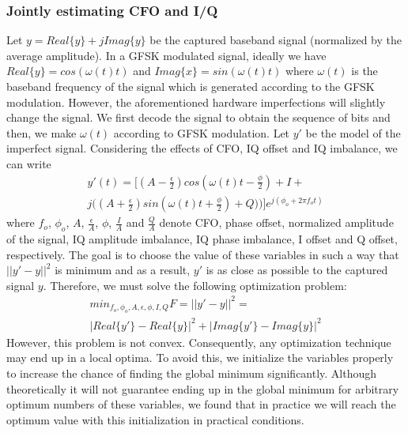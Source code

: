 \subsubsection{Jointly estimating CFO and I/Q}

Let $y = Real\{y\}+jImag\{y\}$ be the captured baseband signal (normalized by the average amplitude). In a GFSK modulated signal, ideally we have $Real\{y\} = cos(\omega(t)t)$ and $Imag\{x\} = sin(\omega(t)t)$ where $\omega(t)$ is the baseband frequency of the signal which is generated according to the GFSK modulation. However, the aforementioned hardware imperfections will slightly change the signal. We first decode the signal to obtain the sequence of bits and then, we make $\omega(t)$ according to GFSK modulation. Let $y'$ be the model of the imperfect signal. Considering the effects of CFO, IQ offset and IQ imbalance, we can write
\begin{gather*}
    y'(t) = \big[(A-\frac{\epsilon}{2})cos(\omega(t)t-\frac{\phi}{2})+I+ \\
    j\big((A+\frac{\epsilon}{2})sin(\omega(t)t+\frac{\phi}{2})+Q)\big)\big]e^{j(\phi_o+2\pi f_o t)}
\end{gather*}
where $f_o$, $\phi_o$, $A$, $\frac{\epsilon}{A}$, $\phi$, $\frac{I}{A}$ and $\frac{Q}{A}$ denote CFO, phase offset, normalized amplitude of the signal, IQ amplitude imbalance, IQ phase imbalance, I offset and Q offset, respectively. The goal is to choose the value of these variables in such a way that $||y'-y||^2$ is minimum and as a result, $y'$ is as close as possible to the captured signal $y$. Therefore, we must solve the following optimization problem:
\begin{gather*}
    min_{f_o,\phi_o,A,\epsilon,\phi,I,Q}{F=||y'-y||^2 =} \\ |Real\{y'\}-Real\{y\}|^2+|Imag\{y'\}-Imag\{y\}|^2
\end{gather*}
However, this problem is not convex. Consequently, any optimization technique may end up in a local optima. To avoid this, we initialize the variables properly to increase the chance of finding the global minimum significantly. Although theoretically it will not guarantee ending up in the global minimum for arbitrary optimum numbers of these variables, we found that in practice we will reach the optimum value with this initialization in practical conditions. 

